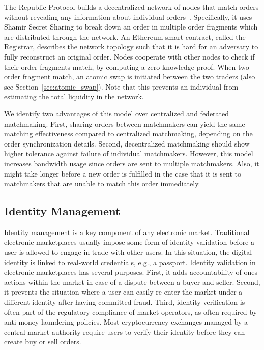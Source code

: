 The Republic Protocol builds a decentralized network of nodes that match orders without revealing any information about individual orders~\cite{Zhang:kGvi0me4}.
Specifically, it uses Shamir Secret Sharing to break down an order in multiple order fragments which are distributed through the network.
An Ethereum smart contract, called the Registrar, describes the network topology such that it is hard for an adversary to fully reconstruct an original order.
Nodes cooperate with other nodes to check if their order fragments match, by computing a zero-knowledge proof.
When two order fragment match, an atomic swap is initiated between the two traders (also see Section~\ref{sec:atomic_swap}).
Note that this prevents an individual from estimating the total liquidity in the network.

We identify two advantages of this model over centralized and federated matchmaking.
First, sharing orders between matchmakers can yield the same matching effectiveness compared to centralized matchmaking, depending on the order synchronization details. %
Second, decentralized matchmaking should show higher tolerance against failure of individual matchmakers.
However, this model increases bandwidth usage since orders are sent to multiple matchmakers.
Also, it might take longer before a new order is fulfilled in the case that it is sent to matchmakers that are unable to match this order immediately.

\subsection{Identity Management}
Identity management is a key component of any electronic market.
Traditional electronic marketplaces usually impose some form of identity validation before a user is allowed to engage in trade with other users.
In this situation, the digital identity is linked to real-world credentials, e.g., a passport.
Identity validation in electronic marketplaces has several purposes.
First, it adds accountability of ones actions within the market in case of a dispute between a buyer and seller.
Second, it prevents the situation where a user can easily re-enter the market under a different identity after having committed fraud.
Third, identity verification is often part of the regulatory compliance of market operators, as often required by anti-money laundering policies.
Most cryptocurrency exchanges managed by a central market authority require users to verify their identity before they can create buy or sell orders.


